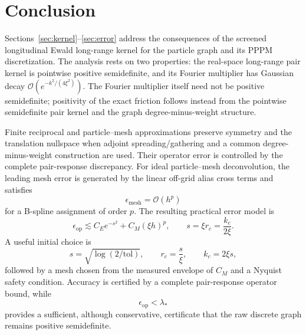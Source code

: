 \documentclass[11pt]{article}
\theoremstyle{plain}
\DeclareRobustCommand{\_}{\textunderscore\allowbreak}
\begin{document}
\section{Conclusion}
\label{sec:conclusion}

Sections~\ref{sec:kernel}--\ref{sec:error} address the
consequences of the screened longitudinal Ewald long-range kernel for the
particle graph and its PPPM discretization. The analysis rests on two
properties: the real-space long-range pair kernel is pointwise positive
semidefinite, and its Fourier multiplier has Gaussian decay
$\mathcal{O}(e^{-k^2/(4\xi^2)})$. The Fourier multiplier itself need not be positive
semidefinite; positivity of the exact friction follows instead from the
pointwise semidefinite pair kernel and the graph degree-minus-weight
structure.

Finite reciprocal and particle--mesh approximations preserve symmetry and
the translation nullspace when adjoint spreading/gathering and a common
degree-minus-weight construction are used. Their operator error is
controlled by the complete pair-response discrepancy. For ideal
particle--mesh deconvolution, the leading mesh error is generated by the
linear off-grid alias cross terms and satisfies
\begin{equation}
\epsilon_{\mathrm{mesh}}=\mathcal{O}(h^p)
\end{equation}
for a B-spline assignment of order $p$. The resulting practical error model
is
\begin{equation}
\epsilon_{\mathrm{op}}
\lesssim
C_Ee^{-s^2}
+
C_M(\xi h)^p,
\qquad
s=\xi r_c=\frac{k_c}{2\xi}.
\end{equation}
A useful initial choice is
\begin{equation}
s=\sqrt{\log(2/\mathrm{tol})},
\qquad
r_c=\frac{s}{\xi},
\qquad
k_c=2\xi s,
\end{equation}
followed by a mesh chosen from the measured envelope of $C_M$ and a Nyquist
safety condition. Accuracy is certified by a complete pair-response
operator bound, while
\begin{equation}
\epsilon_{\mathrm{op}}<\lambda_*
\end{equation}
provides a sufficient, although conservative, certificate that the raw
discrete graph remains positive semidefinite.
\end{document}
